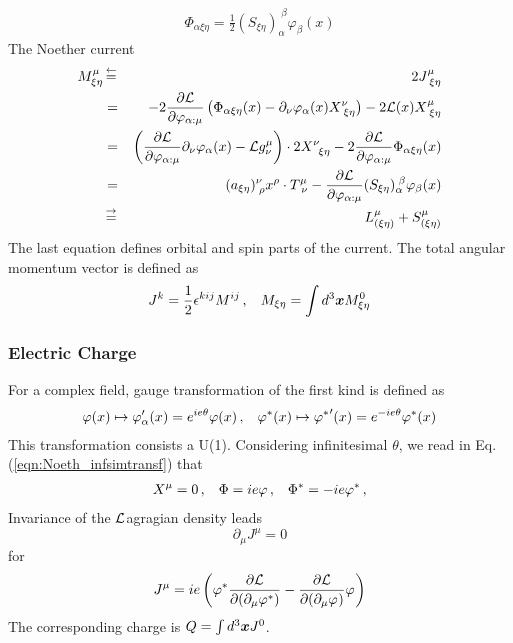 \begin{eqnarray}
\Phi_{\alpha \xi \eta} = 
\frac{1}{2} (S_{\xi \eta})_\alpha^{\;\beta}
\varphi_\beta (x) 
\end{eqnarray}
The Noether current
\begin{eqnarray}
M^\mu_{\xi \eta}
&\,\mbox{$\stackrel{\leftarrow}{=}$}\,&
2 J^\mu_{\;\xi \eta}
\nonumber\\
&=&
-2 \frac{\partial {\cal L}}{\partial \varphi_{\alpha : \mu}}
\left(
\Phi_{\alpha \xi \eta} (x) - \partial_\nu \varphi_\alpha(x) X_{\;\xi \eta}^\nu 
\right)
-2
{\cal L}(x) 
X_{\;\xi \eta}^\mu 
\nonumber\\
&=&
\left(
 \frac{\partial {\cal L}}{\partial \varphi_{\alpha : \mu}}
\partial_\nu \varphi_\alpha(x) 
- 
{\cal L} g^\mu_\nu
\right)
\cdot 2X^\nu_{\;\;\xi \eta}
- 2  \frac{\partial {\cal L}}{\partial \varphi_{\alpha : \mu}}
\Phi_{\alpha \xi \eta} (x)
\nonumber\\
&=&
(a_{\xi \eta})^\nu_{\;\rho} x^\rho \cdot
T^\mu_{\;\nu}
-  \frac{\partial {\cal L}}{\partial \varphi_{\alpha : \mu}}
(S_{\xi \eta})_\alpha^{\;\beta}
\varphi_\beta (x) 
\\
&\,\mbox{$\stackrel{\rightarrow}{=}$}\,&
L^\mu_{(\xi \eta)} + S^\mu_{(\xi \eta)}
\end{eqnarray}
The last equation defines orbital and spin parts of the current.
The total angular momentum vector is defined as
\begin{eqnarray}
J^{k} = \frac{1}{2} \epsilon^{kij} M^{ij}\,,
\hspace{3mm}
M_{\xi \eta} = \int d^3 \mbox{\boldmath $x$} M^0_{\xi \eta}
\label{eqn:NoetherAngularMomentum}
\end{eqnarray}

\subsubsection{Electric Charge}
For a complex field, gauge transformation of the first kind is defined as
\begin{eqnarray}
\varphi(x) \mapsto \varphi'_\alpha(x) = e^{ie \theta} \varphi(x)\,,
\hspace{3mm}
\varphi^*(x) \mapsto {\varphi^{*}}'(x)= e^{-ie \theta} \varphi^*(x)
\end{eqnarray}
This transformation consists a U(1). Considering infinitesimal $\theta$, 
we read in Eq. (\ref{eqn:Noeth_infsimtransf}) that
\begin{eqnarray}
X^\mu = 0\,,
\hspace{3mm}
\Phi = i e \varphi\,,
\hspace{3mm}
\Phi^* = -i e \varphi^*\,,
\end{eqnarray}
Invariance of the ${\cal L}$agragian density leads
\begin{equation}
\partial_\mu J^\mu = 0
\end{equation}
for
\begin{eqnarray}
J^\mu = 
ie \left(
\varphi^*_{} \frac{\partial {\cal L}}{\partial (\partial_\mu \varphi^*_{})} 
-\frac{\partial {\cal L}}{\partial (\partial_\mu \varphi_{})} \varphi_{}
\right)
\label{eqn:NoetherElectricCharge}
\end{eqnarray}
The corresponding charge is $Q = \int d^3 \mbox{\boldmath $x$} J^0$.

